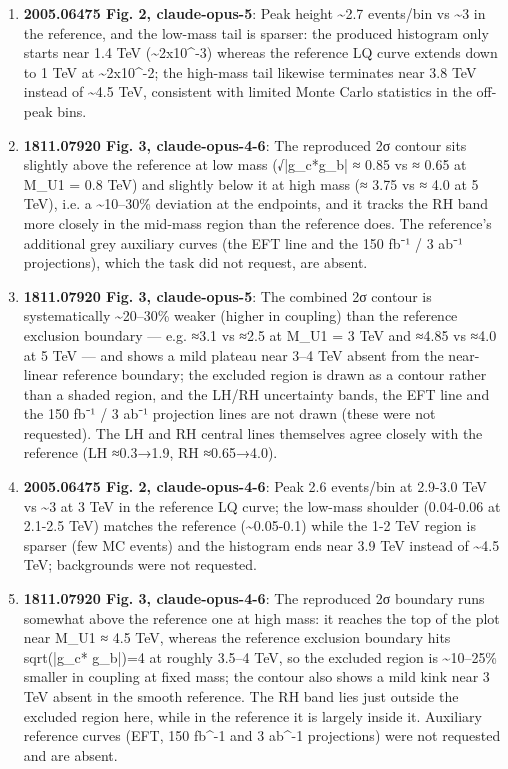 \begin{enumerate}\setlength{\itemsep}{1pt}
\item \textbf{2005.06475 Fig. 2, claude-opus-5}: Peak height \textasciitilde{}2.7 events/bin vs \textasciitilde{}3 in the reference, and the low-mass tail is sparser: the produced histogram only starts near 1.4 TeV (\textasciitilde{}2x10\textasciicircum{}-3) whereas the reference LQ curve extends down to 1 TeV at \textasciitilde{}2x10\textasciicircum{}-2; the high-mass tail likewise terminates near 3.8 TeV instead of \textasciitilde{}4.5 TeV, consistent with limited Monte Carlo statistics in the off-peak bins.
\item \textbf{1811.07920 Fig. 3, claude-opus-4-6}: The reproduced 2σ contour sits slightly above the reference at low mass (√|g\_c*g\_b| ≈ 0.85 vs ≈ 0.65 at M\_U1 = 0.8 TeV) and slightly below it at high mass (≈ 3.75 vs ≈ 4.0 at 5 TeV), i.e. a \textasciitilde{}10–30\% deviation at the endpoints, and it tracks the RH band more closely in the mid-mass region than the reference does. The reference's additional grey auxiliary curves (the EFT line and the 150 fb⁻¹ / 3 ab⁻¹ projections), which the task did not request, are absent.
\item \textbf{1811.07920 Fig. 3, claude-opus-5}: The combined 2σ contour is systematically \textasciitilde{}20–30\% weaker (higher in coupling) than the reference exclusion boundary — e.g. ≈3.1 vs ≈2.5 at M\_U1 = 3 TeV and ≈4.85 vs ≈4.0 at 5 TeV — and shows a mild plateau near 3–4 TeV absent from the near-linear reference boundary; the excluded region is drawn as a contour rather than a shaded region, and the LH/RH uncertainty bands, the EFT line and the 150 fb⁻¹ / 3 ab⁻¹ projection lines are not drawn (these were not requested). The LH and RH central lines themselves agree closely with the reference (LH ≈0.3→1.9, RH ≈0.65→4.0).
\item \textbf{2005.06475 Fig. 2, claude-opus-4-6}: Peak 2.6 events/bin at 2.9-3.0 TeV vs \textasciitilde{}3 at 3 TeV in the reference LQ curve; the low-mass shoulder (0.04-0.06 at 2.1-2.5 TeV) matches the reference (\textasciitilde{}0.05-0.1) while the 1-2 TeV region is sparser (few MC events) and the histogram ends near 3.9 TeV instead of \textasciitilde{}4.5 TeV; backgrounds were not requested.
\item \textbf{1811.07920 Fig. 3, claude-opus-4-6}: The reproduced 2σ boundary runs somewhat above the reference one at high mass: it reaches the top of the plot near M\_U1 ≈ 4.5 TeV, whereas the reference exclusion boundary hits sqrt(|g\_c* g\_b|)=4 at roughly 3.5–4 TeV, so the excluded region is \textasciitilde{}10–25\% smaller in coupling at fixed mass; the contour also shows a mild kink near 3 TeV absent in the smooth reference. The RH band lies just outside the excluded region here, while in the reference it is largely inside it. Auxiliary reference curves (EFT, 150 fb\textasciicircum{}-1 and 3 ab\textasciicircum{}-1 projections) were not requested and are absent.

\end{enumerate}
